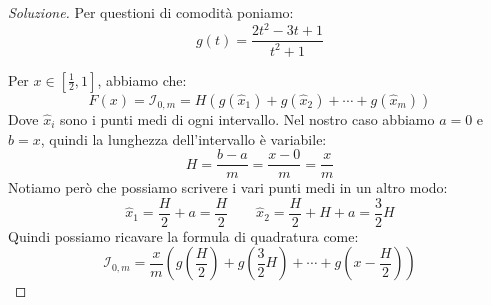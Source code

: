 \documentclass[11pt,a4paper,twoside]{article}
\theoremstyle{definition}
\newenvironment{sol}
	{\renewcommand\qedsymbol{$\blacksquare$}\begin{proof}[Soluzione]}
	{\end{proof}}
\begin{document}
\begin{sol}
	Per questioni di comodità poniamo:
	\[ g(t) = \frac{2t^2 - 3t +1}{t^2+1} \]

	 Per $x \in [\frac 12, 1]$, abbiamo che:
	\[ F(x) = \mathcal I_{0,m} = H(g(\hat x_1) + g(\hat x_2) + \cdots + g(\hat x_m)) \]
	Dove $\hat x_i$ sono i punti medi di ogni intervallo. Nel nostro caso abbiamo $a = 0$ e $b = x$, quindi la lunghezza dell'intervallo è variabile:
	\[ H = \frac{b-a}m = \frac{x-0}m = \frac xm\]
	Notiamo però che possiamo scrivere i vari punti medi in un altro modo:
	\[
		\hat x_1 = \frac H2 + a = \frac H2 \qquad \hat x_2 = \frac H2 + H + a = \frac 32 H
	\]
	Quindi possiamo ricavare la formula di quadratura come:
	\[ \mathcal I_{0,m} = \frac xm \left( g\left( \frac H2 \right) + g\left( \frac 32 H\right) + \cdots + g\left( x-\frac H2 \right) \right) \]


\end{sol}
\end{document}
